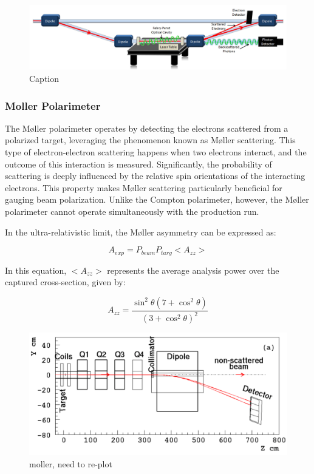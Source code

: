 \begin{figure}[!htbp]
    \centering
    \includegraphics[width=\textwidth]{images/chap3/compton.png}
    \caption{Caption}
    \label{fig:enter-label}
\end{figure}



\subsubsection{Moller Polarimeter}

The Møller polarimeter operates by detecting the electrons scattered from a polarized target, leveraging the phenomenon known as Møller scattering. This type of electron-electron scattering happens when two electrons interact, and the outcome of this interaction is measured. Significantly, the probability of scattering is deeply influenced by the relative spin orientations of the interacting electrons. This property makes Møller scattering particularly beneficial for gauging beam polarization. Unlike the Compton polarimeter, however, the Møller polarimeter cannot operate simultaneously with the production run.

In the ultra-relativistic limit, the Møller asymmetry can be expressed as:

\begin{equation}
A_{exp} = P_{beam}P_{targ}<A_{zz}>
\end{equation}

In this equation, $<A_{zz}>$ represents the average analysis power over the captured cross-section, given by:

\begin{equation}
A_{zz} = \frac{\sin^2{\theta(7 + \cos^2{\theta})}}{(3 + \cos^2{\theta})^2}
\end{equation}

\begin{figure}[!htbp]
    \centering
    \includegraphics[width=\textwidth]{images/chap3/moller.png}
    \caption{moller, need to re-plot}
    \label{fig:enter-label}
\end{figure}

